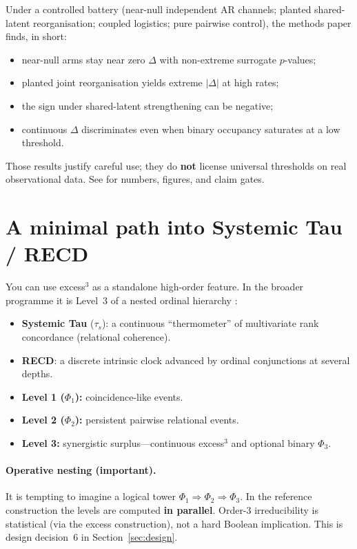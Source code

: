 \documentclass[11pt,a4paper]{article}
\begin{document}
Under a controlled battery (near-null independent AR channels; planted
shared-latent reorganisation; coupled logistics; pure pairwise control), the
methods paper finds, in short:
\begin{itemize}[leftmargin=*,itemsep=2pt]
  \item near-null arms stay near zero $\Delta$ with non-extreme surrogate
  $p$-values;
  \item planted joint reorganisation yields extreme $|\Delta|$ at high rates;
  \item the sign under shared-latent strengthening can be negative;
  \item continuous $\Delta$ discriminates even when binary occupancy
  saturates at a low threshold.
\end{itemize}
Those results justify careful use; they do \textbf{not} license universal
thresholds on real observational data. See
\citep{Padilla2026excess3} for numbers, figures, and claim gates.

\section{A minimal path into Systemic Tau / RECD}
\label{sec:recd_min}

You can use excess$^3$ as a standalone high-order feature. In the broader
programme it is Level~3 of a nested ordinal hierarchy
\citep{Padilla2026framework}:

\begin{itemize}[leftmargin=*,itemsep=3pt]
  \item \textbf{Systemic Tau} ($\tau_s$): a continuous ``thermometer'' of
  multivariate rank concordance (relational coherence).
  \item \textbf{RECD}: a discrete intrinsic clock advanced by ordinal
  conjunctions at several depths.
  \item \textbf{Level 1 ($\Phi_1$):} coincidence-like events.
  \item \textbf{Level 2 ($\Phi_2$):} persistent pairwise relational events.
  \item \textbf{Level 3:} synergistic surplus---continuous excess$^3$ and
  optional binary $\Phi_3$.
\end{itemize}

\paragraph{Operative nesting (important).}
It is tempting to imagine a logical tower
$\Phi_1\Rightarrow\Phi_2\Rightarrow\Phi_3$.
In the reference construction the levels are computed \textbf{in parallel}.
Order-3 irreducibility is statistical (via the excess construction), not a
hard Boolean implication. This is design decision~6 in
Section~\ref{sec:design}.
\end{document}

